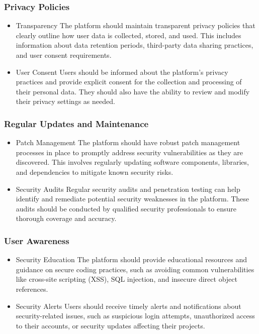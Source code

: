 \subsubsection{Privacy Policies}

\begin{itemize}
    \item{Transparency}
    The platform should maintain transparent privacy policies that clearly outline how user data is collected, stored, and used. This includes information about data retention periods, third-party data sharing practices, and user consent requirements.
    \item {User Consent}
    Users should be informed about the platform's privacy practices and provide explicit consent for the collection and processing of their personal data. They should also have the ability to review and modify their privacy settings as needed.
\end{itemize}

\subsubsection{Regular Updates and Maintenance}

\begin{itemize}
    \item {Patch Management}
    The platform should have robust patch management processes in place to promptly address security vulnerabilities as they are discovered. This involves regularly updating software components, libraries, and dependencies to mitigate known security risks.
    \item {Security Audits}
    Regular security audits and penetration testing can help identify and remediate potential security 	weaknesses in the platform. These audits should be conducted by qualified security professionals to ensure thorough coverage and accuracy.
\end{itemize}

\subsubsection{User Awareness}

\begin{itemize}
    \item {Security Education}
    The platform should provide educational resources and guidance on secure coding practices, such as avoiding common vulnerabilities like cross-site scripting (XSS), SQL injection, and insecure direct object references.
    \item {Security Alerts}
    Users should receive timely alerts and notifications about security-related issues, such as suspicious login attempts, unauthorized access to their accounts, or security updates affecting their projects.
\end{itemize}









